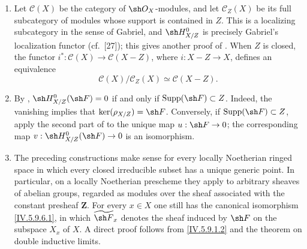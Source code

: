 
\begin{remarks}[5.9.12]
\label{IV.5.9.12}
\begin{enumerate}[{\rm(i)}]
  \item\label{IV.5.9.12.i}
    Let $\mathcal C(X)$ be the category of $\sh O_X$-modules, and let
    $\mathcal C_Z(X)$ be its full subcategory of modules whose support
    is contained in $Z$.  This is a localizing subcategory in the
    sense of Gabriel, and $\sh H^0_{X/Z}$ is precisely Gabriel's
    localization functor (cf.~\textup{[27]}); this gives another proof of
    .  When $Z$ is closed, the functor
    $i^*:\mathcal C(X)\to\mathcal C(X-Z)$, where
    $i:X-Z\to X$, defines an equivalence
    \[
      \mathcal C(X)/\mathcal C_Z(X)\simeq\mathcal C(X-Z).
    \]
  \item\label{IV.5.9.12.ii}
    By ,
    $\sh H^0_{X/Z}(\sh F)=0$ if and only if
    $\operatorname{Supp}(\sh F)\subset Z$.  Indeed, the vanishing
    implies that $\ker(\rho_{X/Z})=\sh F$.  Conversely, if
    $\operatorname{Supp}(\sh F)\subset Z$, apply the second part of
     to the unique map $u:\sh F\to0$; the
    corresponding map $v:\sh H^0_{X/Z}(\sh F)\to0$ is an
    isomorphism.
  \item\label{IV.5.9.12.iii}
    The preceding constructions make sense for every locally
    Noetherian ringed space in which every closed irreducible subset
    has a unique generic point.  In particular, on a locally
    Noetherian prescheme they apply to arbitrary sheaves of abelian
    groups, regarded as modules over the sheaf associated with the
    constant presheaf $\mathbf Z$.  For every $x\in X$ one still has
    the canonical isomorphism \eqref{IV.5.9.6.1}, in which
    $\widetilde{\sh F}_x$ denotes the sheaf induced by $\sh F$ on the
    subspace $X_x$ of $X$.  A direct proof follows from
    \eqref{IV.5.9.1.2} and the theorem on double inductive limits.
\end{enumerate}
\end{remarks}
